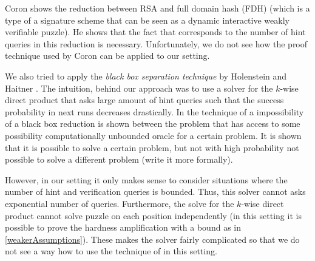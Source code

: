 Coron \cite{coron2000exact, coron2002optimal} shows the reduction between RSA and full domain hash (FDH)
(which is a type of a signature scheme that can be seen as a dynamic interactive weakly verifiable puzzle).
He shows that the fact that corresponds to the number of hint queries in this reduction is necessary.
Unfortunately, we do not see how the proof technique used by Coron can be applied to our setting.

We also tried to apply the \textit{black box separation technique} by Holenstein and Haitner \cite{haitner2009possibility}.
The intuition, behind our approach was to use a solver for the $k$-wise direct product that asks large amount of hint queries such that
the success probability in next runs decreases drastically.
In the technique of \cite{haitner2009possibility} a impossibility of a black box reduction is shown between the problem that has access
to some possibility computationally unbounded oracle for a certain problem. It is shown that it is possible to solve a certain problem,
but not with high probability not possible to solve a different problem (write it more formally).

However, in our setting it only makes sense to consider situations where the number of hint and verification queries is bounded.
Thus, this solver cannot asks exponential number of queries. Furthermore, the solve for the $k$-wise direct product cannot solve puzzle on each position
independently (in this setting it is possible to prove the hardness amplification with a bound as in \ref{weakerAssumptions}).
These makes the solver fairly complicated so that we do not see a way how to use the technique of \cite{haitner2009possibility} in this setting.


